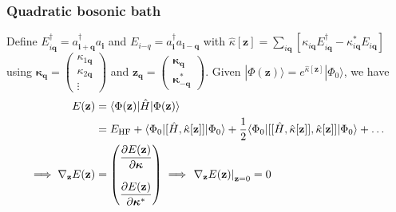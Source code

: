 \begin{frame}
    \frametitle{Quadratic bosonic bath}
Define  $
    E_{i\mathbf q}^{\dagger}
    =
    a_{\mathbf{i}+\mathbf q}^{\dagger}a_{\mathbf i}$ and $
    E_{i\mathbf -q}
    =
    a_{\mathbf i}^{\dagger}a_{\mathbf{i}-\mathbf q}$ with $\hat\kappa[\mathbf z]
    =
    \sum_{i\mathbf q}
    \left[
        \kappa_{i\mathbf q}
        E_{i\mathbf q}^{\dagger}
        -
        \kappa_{i\mathbf q}^{*}
        E_{i\mathbf q}
    \right]$ using $
    \boldsymbol{\kappa}_{\mathbf q}
    =
    \begin{pmatrix}
        \kappa_{1\mathbf q}\\
        \kappa_{2\mathbf q}\\
        \vdots
    \end{pmatrix}
$ and $
    {
    \mathbf z_{\mathbf q}
    =
    \begin{pmatrix}
        \boldsymbol{\kappa}_{\mathbf q}\\
        \boldsymbol{\kappa}_{-\mathbf q}^{*}
    \end{pmatrix}
    }
$. \pause Given $    |\Phi(\mathbf z)\rangle
    =
    e^{\hat\kappa[\mathbf z]}
    |\Phi_0\rangle$, we have \begin{align}
    E(\mathbf z)
    &=
    \langle\Phi(\mathbf z)|
    \hat H
    |\Phi(\mathbf z)\rangle
    \\
    &=
    E_{\rm HF}
    +
    \langle\Phi_0|
    [\hat H,\hat\kappa[\mathbf z]]
    |\Phi_0\rangle
+
    \frac{1}{2}
    \langle\Phi_0|
    [[\hat H,\hat\kappa[\mathbf z]],\hat\kappa[\mathbf z]]
    |\Phi_0\rangle
    +
    \ldots \\ 
\implies     \nabla_{\mathbf z}E(\mathbf z)
    &=
    \begin{pmatrix}
        \dfrac{\partial E(\mathbf z)}
        {\partial\boldsymbol{\kappa}}\\
        \\
        \dfrac{\partial E(\mathbf z)}
        {\partial\boldsymbol{\kappa}^{*}}
    \end{pmatrix} \implies    \left.
    \nabla_{\mathbf z}E(\mathbf z)
    \right|_{\mathbf z=0}
    =
    0
    \label{eq:energy_expansion_kappa}
\end{align}
\end{frame}
